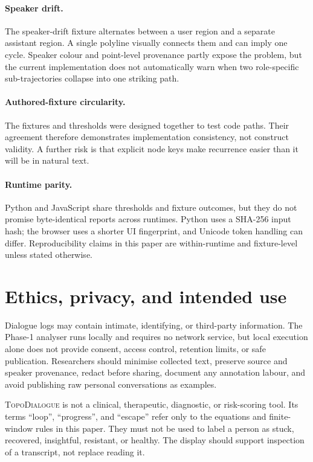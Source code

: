 \documentclass[11pt]{article}
\newcommand{\system}{\textsc{TopoDialogue}}
\begin{document}
\paragraph{Speaker drift.}
The speaker-drift fixture alternates between a user region and a separate
assistant region. A single polyline visually connects them and can imply one
cycle. Speaker colour and point-level provenance partly expose the problem, but
the current implementation does not automatically warn when two role-specific
sub-trajectories collapse into one striking path.

\paragraph{Authored-fixture circularity.}
The fixtures and thresholds were designed together to test code paths. Their
agreement therefore demonstrates implementation consistency, not construct
validity. A further risk is that explicit node keys make recurrence easier than
it will be in natural text.

\paragraph{Runtime parity.}
Python and JavaScript share thresholds and fixture outcomes, but they do not
promise byte-identical reports across runtimes. Python uses a SHA-256 input hash;
the browser uses a shorter UI fingerprint, and Unicode token handling can differ.
Reproducibility claims in this paper are within-runtime and fixture-level unless
stated otherwise.

\section{Ethics, privacy, and intended use}

Dialogue logs may contain intimate, identifying, or third-party information.
The Phase-1 analyser runs locally and requires no network service, but local
execution alone does not provide consent, access control, retention limits, or
safe publication. Researchers should minimise collected text, preserve source
and speaker provenance, redact before sharing, document any annotation labour,
and avoid publishing raw personal conversations as examples.

\system{} is not a clinical, therapeutic, diagnostic, or risk-scoring tool. Its
terms ``loop'', ``progress'', and ``escape'' refer only to the equations and
finite-window rules in this paper. They must not be used to label a person as
stuck, recovered, insightful, resistant, or healthy. The display should support
inspection of a transcript, not replace reading it.
\end{document}
